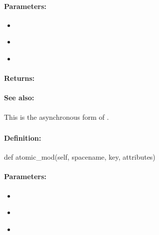\paragraph{Parameters:}
\begin{itemize}[noitemsep]
\item {}\\

\item {}\\

\item {}\\

\end{itemize}

\paragraph{Returns:}


\paragraph{See also:}  This is the asynchronous form of .

\pagebreak
\subsubsection{}
\label{api:python:atomic_mod}


\paragraph{Definition:}
\begin{pythoncode}
def atomic_mod(self, spacename, key, attributes)
\end{pythoncode}

\paragraph{Parameters:}
\begin{itemize}[noitemsep]
\item {}\\

\item {}\\

\item {}\\

\end{itemize}

